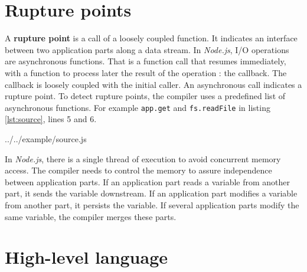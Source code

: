 \section{Rupture points} \label{section:rupture}

A \textbf{rupture point} is a call of a loosely coupled function.
It indicates an interface between two application parts along a data stream.
In \textit{Node.js}, I/O operations are asynchronous functions.
That is a function call that resumes immediately, with a function to process later the result of the operation : the callback.
The callback is loosely coupled with the initial caller.
An asynchronous call indicates a rupture point.
To detect rupture points, the compiler uses a predefined list of asynchronous functions.
For example \texttt{app.get} and \texttt{fs.readFile} in listing \ref{lst:source}, lines 5 and 6.

{../../example/source.js}

In \textit{Node.js}, there is a single thread of execution to avoid concurrent memory access.
The compiler needs to control the memory to assure independence between application parts.
If an application part reads a variable from another part, it sends the variable downstream.
If an application part modifies a variable from another part, it persists the variable.
If several application parts modify the same variable, the compiler merges these parts.


\section{High-level language} \label{section:language}

